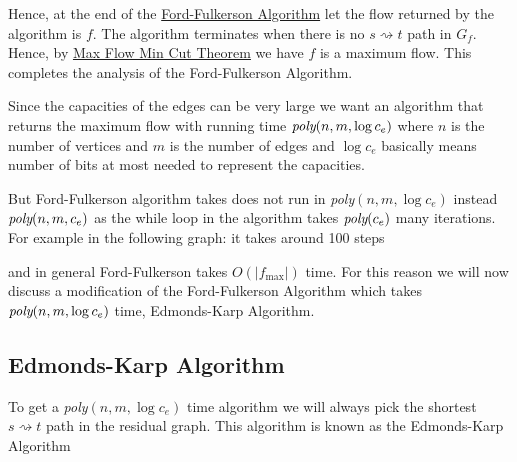 Hence, at the end of the \hyperref[ford-fulkerson]{Ford-Fulkerson Algorithm} let the flow returned by the algorithm is $f$. The algorithm terminates when there is no $s\rightsquigarrow t$ path in $G_f$. Hence, by \hyperref[th:maxflowmincut]{Max Flow Min Cut Theorem} we have $f$ is a maximum flow. This completes the analysis of the Ford-Fulkerson Algorithm.

Since the capacities of the edges can be very large we want an algorithm that returns the maximum flow with running time $\emph{poly}(n,m,\log c_e)$ where $n$ is the number of vertices and $m$ is the number of edges and $\log c_e$ basically means number of bits at most needed to represent the capacities.

But Ford-Fulkerson algorithm takes does not run in \emph{poly}$(n,m,\log c_e)$ instead $\emph{poly}(n,m,c_e)$ as the while loop in the algorithm takes $\emph{poly}(c_e)$ many iterations. For example in the following graph: it takes around 100 steps
\begin{center}
\end{center}
and in general  Ford-Fulkerson takes $O(|f_{\max}|)$ time. For this reason we will now discuss a modification of the Ford-Fulkerson Algorithm which takes $\emph{poly}(n,m,\log c_e)$ time, Edmonds-Karp Algorithm.
\subsection{Edmonds-Karp Algorithm}
To get a \emph{poly}$(n,m,\log c_e)$ time algorithm  we will always pick the shortest $s\rightsquigarrow t$  path in the residual graph. This algorithm is known as the Edmonds-Karp Algorithm

